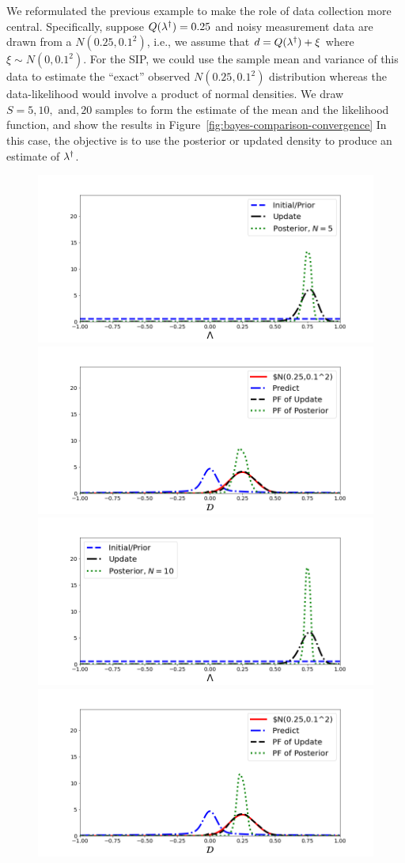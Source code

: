 \begin{ex}
We reformulated the previous example to make the role of data collection more central.
Specifically, suppose $Q(\lambda^\dagger)=0.25$ and noisy measurement data are drawn from a $N(0.25,0.1^2)$, i.e., we assume that $d=Q(\lambda^\dagger)+\xi$ where $\xi\sim N(0,0.1^2)$.
For the SIP, we could use the sample mean and variance of this data to estimate the ``exact'' observed $N(0.25,0.1^2)$ distribution whereas the data-likelihood would involve a product of normal densities.
We draw $S=5, 10, \text{ and}, 20$ samples to form the estimate of the mean and the likelihood function, and show the results in Figure~\ref{fig:bayes-comparison-convergence}
In this case, the objective is to use the posterior or updated density to produce an estimate of $\lambda^\dagger$.

\begin{figure}[htbp]
\centering
   \includegraphics[width=0.49\linewidth]{figures/bip-vs-sip-5.png}
   \includegraphics[width=0.49\linewidth]{figures/bip-vs-sip-pf-5.png}
   \includegraphics[width=0.49\linewidth]{figures/bip-vs-sip-10.png}
   \includegraphics[width=0.49\linewidth]{figures/bip-vs-sip-pf-10.png}

\end{figure}
\end{ex}
